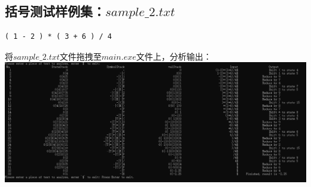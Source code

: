 \documentclass[UTF8]{ctexart}
\begin{document}
\subsection{括号测试样例集：$sample\_2.txt$}
\begin{lstlisting}
( 1 - 2 ) * ( 3 + 6 ) / 4

    \end{lstlisting}
将$sample\_2.txt$文件拖拽至$main.exe$文件上，分析输出： \\
\includegraphics[width=\textwidth]{sample_2}
\end{document}
